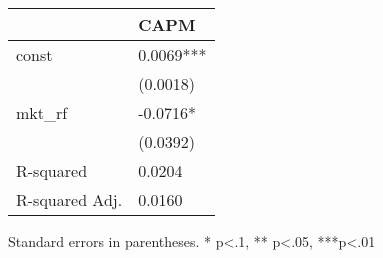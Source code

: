 \begin{table}
\caption{}
\label{}
\begin{center}
\begin{tabular}{ll}
\hline
               & CAPM       \\
\hline
const          & 0.0069***  \\
               & (0.0018)   \\
mkt\_rf        & -0.0716*   \\
               & (0.0392)   \\
R-squared      & 0.0204     \\
R-squared Adj. & 0.0160     \\
\hline
\end{tabular}
\end{center}
\end{table}
\bigskip
Standard errors in parentheses. \newline 
* p<.1, ** p<.05, ***p<.01